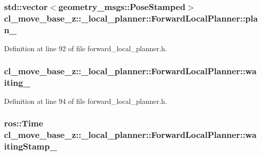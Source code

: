\subsubsection[{\texorpdfstring{plan\+\_\+}{plan_}}]{\setlength{\rightskip}{0pt plus 5cm}std\+::vector$<$geometry\+\_\+msgs\+::\+Pose\+Stamped$>$ cl\+\_\+move\+\_\+base\+\_\+z\+::\+\_\+local\+\_\+planner\+::\+Forward\+Local\+Planner\+::plan\+\_\+\hspace{0.3cm}{\ttfamily [private]}}\hypertarget{classcl__move__base__z_1_1__local__planner_1_1ForwardLocalPlanner_a40d784e351041e2630cb991aadb3f63c}{}\label{classcl__move__base__z_1_1__local__planner_1_1ForwardLocalPlanner_a40d784e351041e2630cb991aadb3f63c}


Definition at line 92 of file forward\+\_\+local\+\_\+planner.\+h.

\subsubsection[{\texorpdfstring{waiting\+\_\+}{waiting_}}]{ cl\+\_\+move\+\_\+base\+\_\+z\+::\+\_\+local\+\_\+planner\+::\+Forward\+Local\+Planner\+::waiting\+\_\+\hspace{0.3cm}{\ttfamily [private]}}\hypertarget{classcl__move__base__z_1_1__local__planner_1_1ForwardLocalPlanner_a770233a577f8478e4382ec4dfd0c848b}{}\label{classcl__move__base__z_1_1__local__planner_1_1ForwardLocalPlanner_a770233a577f8478e4382ec4dfd0c848b}


Definition at line 94 of file forward\+\_\+local\+\_\+planner.\+h.

\subsubsection[{\texorpdfstring{waiting\+Stamp\+\_\+}{waitingStamp_}}]{\setlength{\rightskip}{0pt plus 5cm}ros\+::\+Time cl\+\_\+move\+\_\+base\+\_\+z\+::\+\_\+local\+\_\+planner\+::\+Forward\+Local\+Planner\+::waiting\+Stamp\+\_\+\hspace{0.3cm}{\ttfamily [private]}}\hypertarget{classcl__move__base__z_1_1__local__planner_1_1ForwardLocalPlanner_a60c8c2131183354610811c3b9ec3f234}{}\label{classcl__move__base__z_1_1__local__planner_1_1ForwardLocalPlanner_a60c8c2131183354610811c3b9ec3f234}


